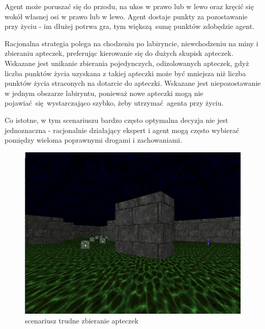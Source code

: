Agent może poruszać się do przodu, na ukos w prawo lub w lewo oraz kręcić się wokół własnej osi w prawo lub w lewo. Agent dostaje punkty za pozostawanie przy życiu - im dłużej potrwa gra, tym większą sumę punktów zdobędzie agent.

Racjonalna strategia polega na chodzeniu po labiryncie, niewchodzeniu na miny i zbieraniu apteczek, preferując kierowanie się do dużych skupisk apteczek. Wskazane jest unikanie zbierania pojedynczych, odizolowanych apteczek, gdyż liczba punktów życia uzyskana z takiej apteczki może być mniejsza niż liczba punktów życia straconych na dotarcie do apteczki. Wskazane jest niepozostawanie w jednym obszarze labiryntu, ponieważ nowe apteczki mogą nie pojawiać się wystarczająco szybko, żeby utrzymać agenta przy życiu.

Co istotne, w tym scenariuszu bardzo często optymalna decyzja nie jest jednoznaczna - racjonalnie działający ekspert i agent mogą często wybierać pomiędzy wieloma poprawnymi drogami i zachowaniami.
\begin{center}
\begin{figure}[H]
\includegraphics[scale = 0.4]{figures/screens/scenarios/hgs.png}{\caption{scenariusz trudne zbieranie apteczek}\label{fig:scenario_hgs}}
\end{figure}
\end{center}
